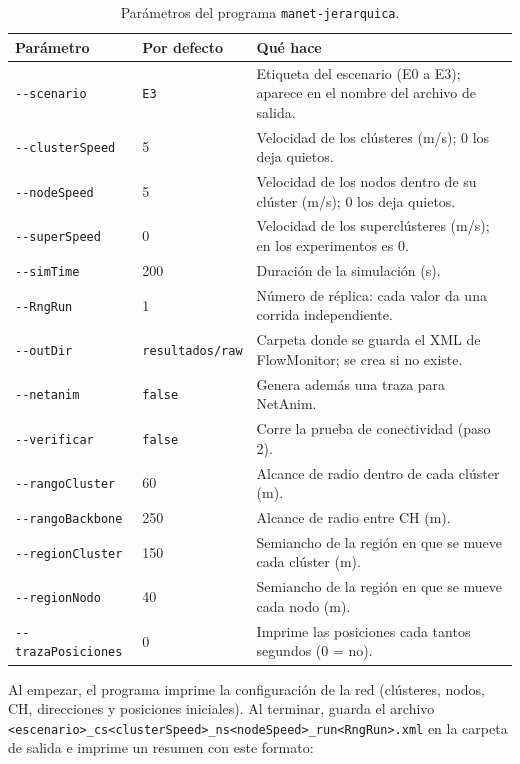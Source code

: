 \begin{table}[h]
\centering
\small
\begin{tabular}{p{3.1cm}p{2.0cm}p{7.2cm}}
\toprule
\textbf{Parámetro} & \textbf{Por defecto} & \textbf{Qué hace} \\
\midrule
\texttt{-{}-scenario} & \texttt{E3} & Etiqueta del escenario (E0 a E3); aparece en el nombre del archivo de salida. \\
\texttt{-{}-clusterSpeed} & 5 & Velocidad de los clústeres (m/s); 0 los deja quietos. \\
\texttt{-{}-nodeSpeed} & 5 & Velocidad de los nodos dentro de su clúster (m/s); 0 los deja quietos. \\
\texttt{-{}-superSpeed} & 0 & Velocidad de los superclústeres (m/s); en los experimentos es 0. \\
\texttt{-{}-simTime} & 200 & Duración de la simulación (s). \\
\texttt{-{}-RngRun} & 1 & Número de réplica: cada valor da una corrida independiente. \\
\texttt{-{}-outDir} & \texttt{resultados/\allowbreak{}raw} & Carpeta donde se guarda el XML de FlowMonitor; se crea si no existe. \\
\texttt{-{}-netanim} & \texttt{false} & Genera además una traza para NetAnim. \\
\texttt{-{}-verificar} & \texttt{false} & Corre la prueba de conectividad (paso 2). \\
\texttt{-{}-rangoCluster} & 60 & Alcance de radio dentro de cada clúster (m). \\
\texttt{-{}-rangoBackbone} & 250 & Alcance de radio entre CH (m). \\
\texttt{-{}-regionCluster} & 150 & Semiancho de la región en que se mueve cada clúster (m). \\
\texttt{-{}-regionNodo} & 40 & Semiancho de la región en que se mueve cada nodo (m). \\
\texttt{-{}-trazaPosiciones} & 0 & Imprime las posiciones cada tantos segundos (0 = no). \\
\bottomrule
\end{tabular}
\caption{Parámetros del programa \texttt{manet-jerarquica}.}
\label{tab:manual-parametros}
\end{table}

{\sloppy
Al empezar, el programa imprime la configuración de la red (clústeres, nodos, CH,
direcciones y posiciones iniciales). Al terminar, guarda el archivo
\texttt{<escenario>\_\allowbreak{}cs<clusterSpeed>\_\allowbreak{}ns<nodeSpeed>\_\allowbreak{}run<RngRun>.xml} en la carpeta de
salida e imprime un resumen con este formato:\par}

